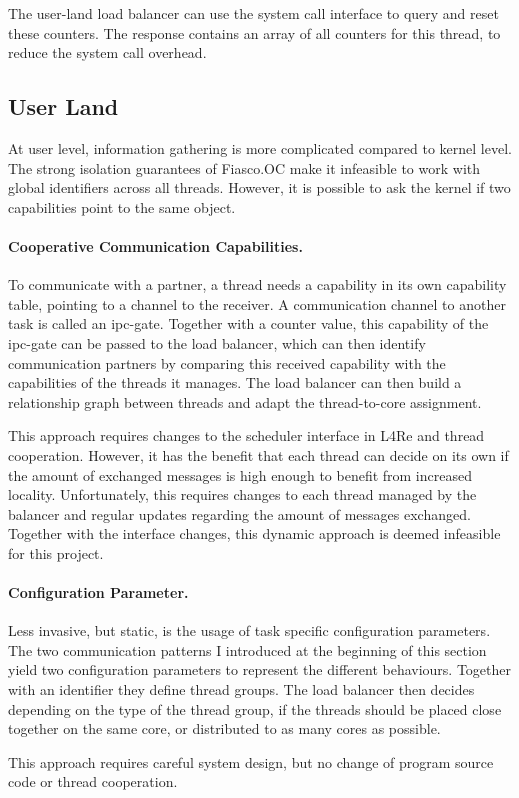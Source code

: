The user-land load balancer can use the system call interface to query
and reset these counters.
The response contains an array of all counters for this thread, to reduce the
system call overhead.


\subsection{User Land}
At user level, information gathering is more complicated compared to
kernel level.
The strong isolation guarantees of Fiasco.OC make it infeasible to work with global
identifiers across all threads.
However, it is possible to ask the kernel if two capabilities point to the
same object.

\paragraph{Cooperative Communication Capabilities.}
To communicate with a partner, a thread needs a capability in its own
capability table, pointing to a channel to the receiver.
A communication channel to another task is called an \gls{ipc}-gate.
Together with a counter value, this capability of the \gls{ipc}-gate can be
passed to the load balancer, which can then identify communication partners by
comparing this received capability with the capabilities of the threads
it manages.
The load balancer can then build a relationship graph between threads and adapt
the thread-to-core assignment.

This approach requires changes to the scheduler interface in L4Re and
thread cooperation.
However, it has the benefit that each thread can decide on its own if the
amount of exchanged messages is high enough to benefit from increased
locality.
Unfortunately, this requires changes to each thread managed by the balancer and
regular updates regarding the amount of messages exchanged.
Together with the interface changes, this dynamic approach is deemed infeasible
for this project.

\paragraph{Configuration Parameter.}
Less invasive, but static, is the usage of task specific configuration parameters.
The two communication patterns I introduced at the beginning of this section
yield two configuration parameters to represent the different behaviours.
Together with an identifier they define thread groups.
The load balancer then decides depending on the type of the thread group, if
the threads should be placed close together on the same core, or distributed to
as many cores as possible.

This approach requires careful system design, but no change of program source
code or thread cooperation.
